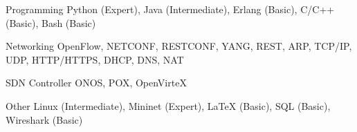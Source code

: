 

\begin{cvskills}

  \cvskill
    {Programming} %
    {Python (Expert), Java (Intermediate), Erlang (Basic), C/C++ (Basic),
    	Bash (Basic)} %

  \cvskill
    {Networking} %
    {OpenFlow, NETCONF, RESTCONF, YANG, REST, ARP, TCP/IP, UDP, HTTP/HTTPS,
    	DHCP, DNS, NAT} %

  \cvskill
    {SDN Controller} %
    {ONOS, POX, OpenVirteX} %

  \cvskill
    {Other} %
    {Linux (Intermediate), Mininet (Expert), LaTeX (Basic), SQL (Basic), Wireshark (Basic)} %
\end{cvskills}